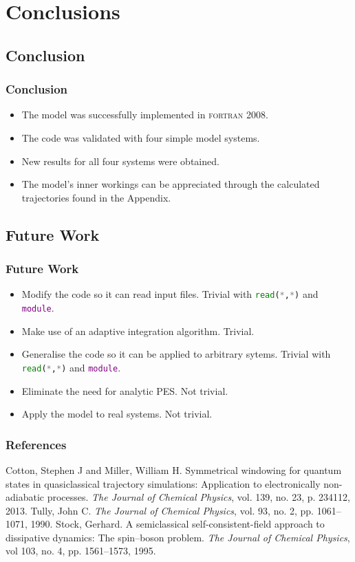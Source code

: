 \documentclass[xetex,mathserif,serif]{beamer}
\let\oldbibitem=\bibitem
\renewcommand{\bibitem}[2][]{\label{#2}\oldbibitem[#1]{#2}}
\begin{document}
\section{Conclusions}
\subsection{Conclusion}
\begin{frame}
\frametitle{Conclusion}
\begin{itemize}
\item The model was successfully implemented in \textsc{fortran 2008}.
\item The code was validated with four simple model systems.
\item New results for all four systems were obtained.
\item The model's inner workings can be appreciated through the calculated trajectories found in the Appendix.
\end{itemize}
\end{frame}

\subsection{Future Work}
\begin{frame}
\frametitle{Future Work}
\begin{itemize}
\item Modify the code so it can read input files. Trivial with \texttt{\textcolor{green}{read}(\textcolor{grey}{*},\textcolor{grey}{*})} and \texttt{\textcolor{purple}{module}}.
\item Make use of an adaptive integration algorithm. Trivial.
\item Generalise the code so it can be applied to arbitrary sytems. Trivial with \texttt{\textcolor{green}{read}(\textcolor{grey}{*},\textcolor{grey}{*})} and \texttt{\textcolor{purple}{module}}.
\item Eliminate the need for analytic PES. Not trivial.
\item Apply the model to real systems. Not trivial.
\end{itemize}
\end{frame}

\appendix
\begin{frame}
\frametitle{References}
\begin{thebibliography}{10}
\bibitem{project}
Cotton, Stephen J and Miller, William H.
\newblock Symmetrical windowing for quantum states in quasiclassical trajectory simulations: Application to electronically non-adiabatic processes.
\newblock \emph{The Journal of Chemical Physics}, vol. 139, no. 23, p. 234112, 2013.
\bibitem{tully}
Tully, John C.
\newblock \emph{The Journal of Chemical Physics}, vol. 93, no. 2, pp. 1061--1071, 1990.
\bibitem{spin-boson}
Stock, Gerhard.
\newblock A semiclassical self-consistent-field approach to dissipative dynamics: The spin--boson problem.
\newblock \emph{The Journal of Chemical Physics}, vol 103, no. 4, pp. 1561--1573, 1995.
\end{thebibliography}
\end{frame}
\end{document}
